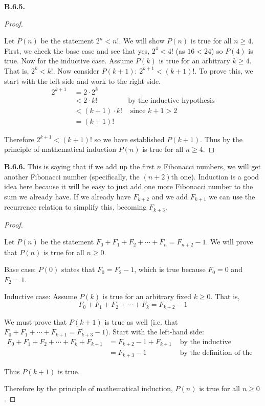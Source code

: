 \documentclass[10pt,]{book}
\theoremstyle{plain}
\theoremstyle{definition}
\theoremstyle{definition}
\theoremstyle{definition}
\theoremstyle{definition}
\numberwithin{equation}{chapter}
\newcommand{\lt}{<}
\newcommand{\gt}{>}
\newcommand{\amp}{&}
\begin{document}
\noindent\textbf{B.6.5.} \begin{proof}\hypertarget{proof-45}{}
\hypertarget{p-2269}{}%
Let \(P(n)\) be the statement \(2^n \lt  n!\). We will show \(P(n)\) is true for all \(n \ge 4\). First, we check the base case and see that yes, \(2^4 \lt  4!\) (as \(16 \lt  24\)) so \(P(4)\) is true. Now for the inductive case. Assume \(P(k)\) is true for an arbitrary \(k \ge 4\). That is, \(2^k \lt  k!\). Now consider \(P(k+1)\): \(2^{k+1} \lt  (k+1)!\). To prove this, we start with the left side and work to the right side.%
\begin{align*}
2^{k+1}~ \amp = 2\cdot 2^k \amp\\
\amp \lt 2\cdot k! \amp \text{by the inductive hypothesis}\\
\amp \lt (k+1) \cdot k! \amp \text{ since } k+1 \gt 2\\
\amp = (k+1)! \amp
\end{align*}
%
\par
\hypertarget{p-2270}{}%
Therefore \(2^{k+1} \lt  (k+1)!\) so we have established \(P(k+1)\). Thus by the principle of mathematical induction \(P(n)\) is true for all \(n \ge 4\).%
\end{proof}
\par\smallskip
\noindent\textbf{B.6.6.} \hypertarget{p-2272}{}%
This is saying that if we add up the first \(n\) Fibonacci numbers, we will get another Fibonacci number (specifically, the \((n+2)\)th one). Induction is a good idea here because it will be easy to just add one more Fibonacci number to the sum we already have. If we already have \(F_{k+2}\) and we add \(F_{k+1}\) we can use the recurrence relation to simplify this, becoming \(F_{k+3}\).%
\begin{proof}\hypertarget{proof-46}{}
\hypertarget{p-2273}{}%
Let \(P(n)\) be the statement \(F_0 + F_1 + F_2 + \cdots + F_n = F_{n+2} - 1\). We will prove that \(P(n)\) is true for all \(n \ge 0\).%
\par
\hypertarget{p-2274}{}%
Base case: \(P(0)\) states that \(F_0 = F_2 - 1\), which is true because \(F_0 = 0\) and \(F_2 = 1\).%
\par
\hypertarget{p-2275}{}%
Inductive case: Assume \(P(k)\) is true for an arbitrary fixed \(k \ge 0\). That is,%
\begin{equation*}
F_0 + F_1 + F_2 + \cdots + F_k = F_{k+2} - 1
\end{equation*}
%
\par
\hypertarget{p-2276}{}%
We must prove that \(P(k+1)\) is true as well (i.e. that \(F_0 + F_1 + \cdots +F_{k+1} = F_{k+3} - 1\)). Start with the left-hand side:%
\begin{align*}
F_0 + F_1 + F_2 + \cdots + F_k + F_{k+1} \amp = F_{k+2} - 1 + F_{k+1} \amp \mbox{ by the inductive hypothesis}\\
\amp = F_{k+3} - 1 \amp \mbox{ by the definition of the Fibonacci numbers}
\end{align*}
%
\par
\hypertarget{p-2277}{}%
Thus \(P(k+1)\) is true.%
\par
\hypertarget{p-2278}{}%
Therefore by the principle of mathematical induction, \(P(n)\) is true for all \(n \ge 0\).%
\end{proof}
\end{document}
